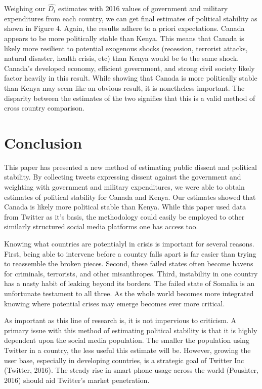 \documentclass[12pt]{article}
\begin{document}
\begin{spacing}{1.5}
Weighing our $\hat{D_t}$ estimates with 2016 values of government and military expenditures from each country, we can get final estimates of political stability as shown in Figure 4. Again, the results adhere to a priori expectations. Canada appears to be more politically stable than Kenya. This means that Canada is likely more resilient to potential exogenous shocks (recession, terrorist attacks, natural disaster, health crisis, etc) than Kenya would be to the same shock. Canada's developed economy, efficient government, and strong civil society likely factor heavily in this result. While showing that Canada is more politically stable than Kenya may seem like an obvious result, it is nonetheless important. The disparity between the estimates of the two signifies that this is a valid method of cross country comparison. 

\section*{Conclusion}

This paper has presented a new method of estimating public dissent and political stability. By collecting tweets expressing dissent against the government and weighting with government and military expenditures, we were able to obtain estimates of political stability for Canada and Kenya. Our estimates showed that Canada is likely more political stable than Kenya. While this paper used data from Twitter as it's basis, the methodology could easily be employed to other similarly structured social media platforms one has access too.    


Knowing what countries are potentialyl in crisis is important for several reasons. First, being able to intervene before a country falls apart is far easier than trying to reassemble the broken pieces. Second, these failed states often become havens for criminals, terrorists, and other misanthropes. Third, instability in one country has a nasty habit of leaking beyond its borders. The failed state of Somalia is an unfortunate testament to all three. As the whole world becomes more integrated knowing where potential crises may emerge becomes ever more critical. 


As important as this line of research is, it is not impervious to criticism. A primary issue with this method of estimating political stability is that it is highly dependent upon the social media population. The smaller the population using Twitter in a country, the less useful this estimate will be. However, growing the user base, especially in developing countries, is a strategic goal of Twitter Inc (Twitter, 2016). The steady rise in smart phone usage across the world (Poushter, 2016) should aid Twitter's market penetration. 


\end{spacing}
\end{document}
